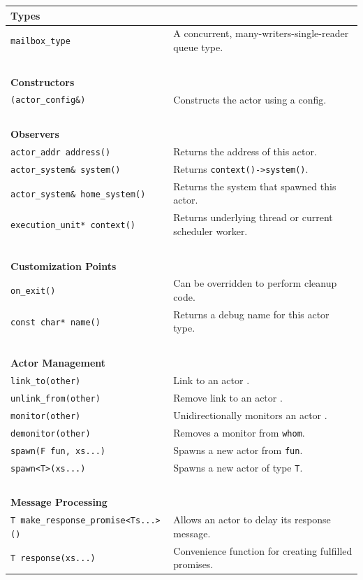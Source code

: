 \begin{center}
\small
\begin{tabular}{ll}
  \textbf{Types} & ~ \\
  \hline
  \lstinline^mailbox_type^ & A concurrent, many-writers-single-reader queue type. \\
  \hline
  ~ & ~ \\ \textbf{Constructors} & ~ \\
  \hline
  \lstinline^(actor_config&)^ & Constructs the actor using a config. \\
  \hline
  ~ & ~ \\ \textbf{Observers} & ~ \\
  \hline
  \lstinline^actor_addr address()^ & Returns the address of this actor. \\
  \hline
  \lstinline^actor_system& system()^ & Returns \lstinline^context()->system()^. \\
  \hline
  \lstinline^actor_system& home_system()^ & Returns the system that spawned this actor. \\
  \hline
  \lstinline^execution_unit* context()^ & Returns underlying thread or current scheduler worker. \\
  \hline
  ~ & ~ \\ \textbf{Customization Points} & ~ \\
  \hline
  \lstinline^on_exit()^ & Can be overridden to perform cleanup code. \\
  \hline
  \lstinline^const char* name()^ & Returns a debug name for this actor type. \\
  \hline
  ~ & ~ \\ \textbf{Actor Management} & ~ \\
  \hline
  \lstinline^link_to(other)^ & Link to an actor . \\
  \hline
  \lstinline^unlink_from(other)^ & Remove link to an actor . \\
  \hline
  \lstinline^monitor(other)^ & Unidirectionally monitors an actor . \\
  \hline
  \lstinline^demonitor(other)^ & Removes a monitor from \lstinline^whom^. \\
  \hline
  \lstinline^spawn(F fun, xs...)^ & Spawns a new actor from \lstinline^fun^. \\
  \hline
  \lstinline^spawn<T>(xs...)^ & Spawns a new actor of type \lstinline^T^. \\
  \hline
  ~ & ~ \\ \textbf{Message Processing} & ~ \\
  \hline
  \lstinline^T make_response_promise<Ts...>()^ & Allows an actor to delay its response message. \\
  \hline
  \lstinline^T response(xs...)^ & Convenience function for creating fulfilled promises. \\
  \hline
\end{tabular}
\end{center}

